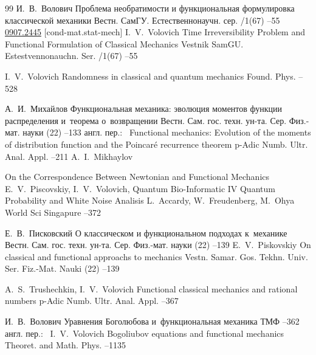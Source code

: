 \begin{thebibliography}{99}
\by И.~В.~Волович
\paper Проблема необратимости и функциональная формулировка классической механики
\jour Вестн. СамГУ. Естественнонаучн. сер.
/1(67)
–55
\arxiv \href{http://arxiv.org/abs/0907.2445}{0907.2445} [cond-mat.stat-mech] 
\misctransl
\by I.~V.~Volovich
\paper Time Irreversibility Problem and Functional Formulation of Classical Mechanics
\jour Vestnik SamGU. Estestvennonauchn. Ser.
/1(67)
–55

\by I.~V.~Volovich
\paper Randomness in classical and quantum mechanics
\jour Found. Phys.
--528

\by А.~И.~Михайлов
\paper Функциональная механика: эволюция моментов функции распределения и~теорема о~возвращении
\jour Вестн. Сам. гос. техн. ун-та. Сер. Физ.-мат. науки
(22)
--133
\transl англ. пер.:~
\paper Functional mechanics: Evolution of the moments of distribution function and the Poincar\'e recurrence theorem
\jour p-Adic Numb. Ultr. Anal. Appl.
--211
\by A.~I.~Mikhaylov 


\paper On the Correspondence Between Newtonian and Functional Mechanics
\by E.~V.~Piscovskiy, I.~V.~Volovich, 
\inbook Quantum Bio-Informatic IV
\serial Quantum Probability and White Noise Analisis
\eds L.~Accardy, W.~Freudenberg, M.~Ohya
\publ World Sci
\publaddr Singapure
--372

\by Е.~В.~Писковский
\paper О классическом и функциональном подходах к~механике
\jour Вестн. Сам. гос. техн. ун-та. Сер. Физ.-мат. науки
(22)
--139
\misctransl
\by E.~V.~Piskovskiy
\paper On classical and functional approachs to mechanics
\jour Vestn. Samar. Gos. Tekhn. Univ. Ser. Fiz.-Mat. Nauki
(22)
--139


\by A.~S.~Trushechkin, I.~V.~Volovich
\paper Functional classical mechanics and rational numbers
\jour p-Adic Numb. Ultr. Anal. Appl.
--367

\by И.~В.~Волович
\paper Уравнения Боголюбова и~функциональная механика
\jour ТМФ
--362
\transl англ. пер.:~
\by I.~V.~Volovich
\paper Bogoliubov equations and functional mechanics
\jour Theoret. and Math. Phys.
--1135


\end{thebibliography}
